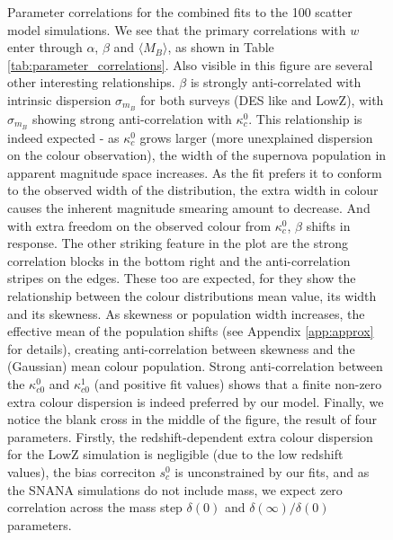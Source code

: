 \documentclass[a4paper,fleqn,usenatbib]{mnras}
\newcommand{\gten}{\citetalias{Guy2010}}
\begin{document}
\begin{figure}
	\caption{Parameter correlations for the combined fits to the 100 {\gten} scatter model simulations. We see that the primary correlations with $w$ enter through $\alpha$, $\beta$ and $\langle M_B \rangle$, as shown in Table \ref{tab:parameter_correlations}. Also visible in this figure are several other interesting relationships. $\beta$ is strongly anti-correlated with intrinsic dispersion $\sigma_{m_B}$ for both surveys (DES like and LowZ), with $\sigma_{m_B}$ showing strong anti-correlation with $\kappa^0_c$. This relationship is indeed expected - as $\kappa^0_c$ grows larger (more unexplained dispersion on the colour observation), the width of the supernova population in apparent magnitude space increases. As the fit prefers it to conform to the observed width of the distribution, the extra width in colour causes the inherent magnitude smearing amount to decrease. And with extra freedom on the observed colour from $\kappa^0_c$, $\beta$ shifts in response. The other striking feature in the plot are the strong correlation blocks in the bottom right and the anti-correlation stripes on the edges. These too are expected, for they show the relationship between the colour distributions mean value, its width and its skewness. As skewness or population width increases, the effective mean of the population shifts (see Appendix \ref{app:approx} for details), creating anti-correlation between skewness and the (Gaussian) mean colour population. Strong anti-correlation between the $\kappa_{c0}^0$ and $\kappa_{c0}^1$ (and positive fit values) shows that a finite non-zero extra colour dispersion is indeed preferred by our model.  Finally, we notice the blank cross in the middle of the figure, the result of four parameters. Firstly, the redshift-dependent extra colour dispersion for the LowZ simulation is negligible (due to the low redshift values), the bias correciton $s_c^0$ is unconstrained by our fits, and as the SNANA simulations do not include mass, we expect zero correlation across the mass step $\delta(0)$ and $\delta(\infty)/\delta(0)$ parameters. }
	\label{fig:bulk_cor}
\end{figure}
\end{document}
